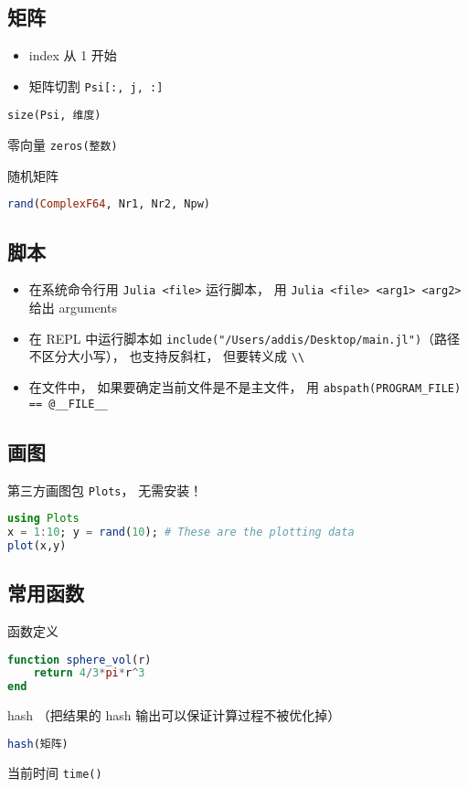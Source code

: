 \subsection{矩阵}
\begin{itemize}
\item index 从 1 开始
\item 矩阵切割 \verb|Psi[:, j, :]|
\end{itemize}



\verb|size(Psi, 维度)|

零向量 \verb|zeros(整数)|

随机矩阵
\begin{lstlisting}[language=Julia]
rand(ComplexF64, Nr1, Nr2, Npw)
\end{lstlisting}

\subsection{脚本}
\begin{itemize}
\item 在系统命令行用 \verb|Julia <file>| 运行脚本， 用 \verb|Julia <file> <arg1> <arg2>| 给出 arguments
\item 在 REPL 中运行脚本如 \verb|include("/Users/addis/Desktop/main.jl")|（路径不区分大小写）， 也支持反斜杠， 但要转义成 \verb|\\|
\item 在文件中， 如果要确定当前文件是不是主文件， 用 \verb|abspath(PROGRAM_FILE) == @__FILE__|
\end{itemize}

\subsection{画图}
第三方画图包 \verb|Plots|， 无需安装！
\begin{lstlisting}[language=Julia]
using Plots
x = 1:10; y = rand(10); # These are the plotting data
plot(x,y)
\end{lstlisting}

\subsection{常用函数}
函数定义
\begin{lstlisting}[language=Julia]
function sphere_vol(r)
    return 4/3*pi*r^3
end
\end{lstlisting}

hash （把结果的 hash 输出可以保证计算过程不被优化掉）
\begin{lstlisting}[language=Julia]
hash(矩阵)
\end{lstlisting}

当前时间 \verb|time()|
